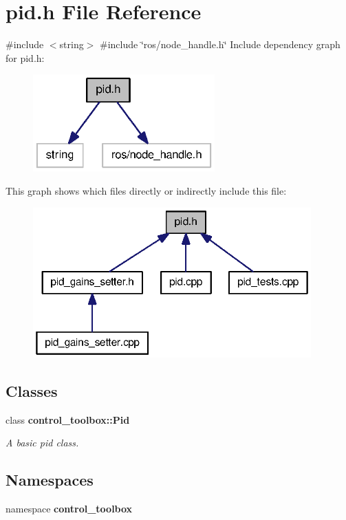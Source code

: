 \section{pid.\-h \-File \-Reference}
\label{pid_8h}
{\ttfamily \#include $<$string$>$}\*
{\ttfamily \#include \char`\"{}ros/node\-\_\-handle.\-h\char`\"{}}\*
\-Include dependency graph for pid.\-h\-:
\nopagebreak
\begin{figure}[H]
\begin{center}
\leavevmode
\includegraphics[width=198pt]{pid_8h__incl}
\end{center}
\end{figure}
\-This graph shows which files directly or indirectly include this file\-:
\nopagebreak
\begin{figure}[H]
\begin{center}
\leavevmode
\includegraphics[width=303pt]{pid_8h__dep__incl}
\end{center}
\end{figure}
\subsection*{\-Classes}
\begin{DoxyCompactItemize}
\item 
class {\bf control\-\_\-toolbox\-::\-Pid}
\begin{DoxyCompactList}\small\item\em \-A basic pid class. \end{DoxyCompactList}\end{DoxyCompactItemize}
\subsection*{\-Namespaces}
\begin{DoxyCompactItemize}
\item 
namespace {\bf control\-\_\-toolbox}
\end{DoxyCompactItemize}
